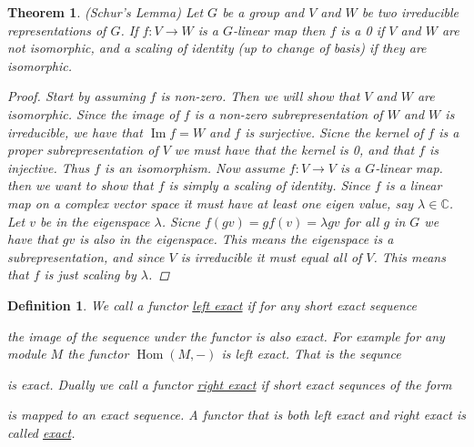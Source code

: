 \documentclass[11pt, a4paper, english]{article}
\numberwithin{prop}{section}
\numberwithin{lemma}{section}
\newtheorem{theorem}{Theorem}
\numberwithin{theorem}{section}
\newtheorem{defin}{Definition}
\numberwithin{defin}{section}
\numberwithin{example}{section}
\newcommand{\C}{\mathbb{C}}
\DeclareMathOperator{\Hom}{Hom}
\DeclareMathOperator{\Image}{Im}
\begin{document}
\begin{appendices}
\begin{theorem}
\label{schur}
(Schur's Lemma) Let $G$ be a group and $V$ and $W$ be two irreducible representations of $G$. If $f:V \to W$ is a $G$-linear map then $f$ is a 0 if $V$ and $W$ are not isomorphic, and a scaling of identity (up to change of basis) if they are isomorphic.
\begin{proof}
Start by assuming $f$ is non-zero. Then we will show that $V$ and $W$ are isomorphic. Since the image of $f$ is a non-zero subrepresentation of $W$ and $W$ is irreducible, we have that $\Image f = W$ and $f$ is surjective. Sicne the kernel of $f$ is a proper subrepresentation of $V$ we must have that the kernel is 0, and that $f$ is injective. Thus $f$ is an isomorphism.
Now assume $f: V \to V$ is a $G$-linear map. then we want to show that $f$ is simply a scaling of identity. Since $f$ is a linear map on a complex vector space it must have at least one eigen value, say $\lambda \in \C$. Let $v$ be in the eigenspace $\lambda$. Sicne $f(gv) = g f(v) = \lambda gv$ for all $g$ in $G$ we have that $gv$ is also in the eigenspace. This means the eigenspace is a subrepresentation, and since $V$ is irreducible it must equal all of $V$. This means that $f$ is just scaling by $\lambda$.
\end{proof}
\end{theorem}

\begin{defin}
We call a functor \underline{left exact} if for any short exact sequence
\begin{center}
\end{center}
the image of the sequence under the functor is also exact. For example for any module $M$ the functor $\Hom(M, -)$ is left exact. That is the sequnce
\begin{center}
\end{center}
is exact. Dually we call a functor \underline{right exact} if short exact sequnces of the form
\begin{center}
\end{center}
is mapped to an exact sequence. A functor that is both left exact and right exact is called \underline{exact}.
\end{defin}


\end{appendices}
\end{document}
